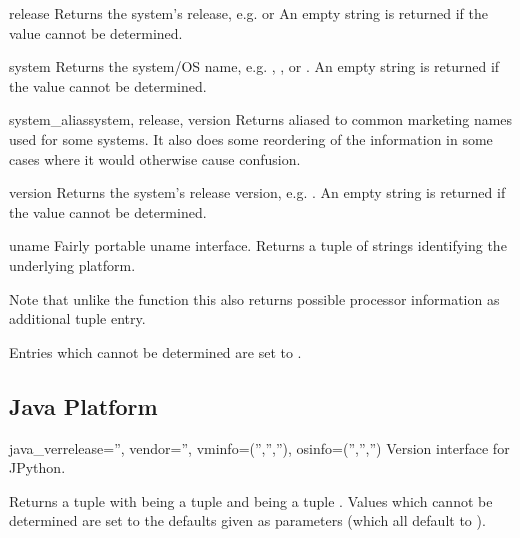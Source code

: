 \begin{funcdesc}{release}{}
  Returns the system's release, e.g.  or 
  An empty string is returned if the value cannot be determined.
\end{funcdesc}

\begin{funcdesc}{system}{}
  Returns the system/OS name, e.g. , ,
  or .
  An empty string is returned if the value cannot be determined.
\end{funcdesc}

\begin{funcdesc}{system_alias}{system, release, version}
  Returns  aliased
  to common marketing names used for some systems.  It also does some
  reordering of the information in some cases where it would otherwise
  cause confusion.
\end{funcdesc}

\begin{funcdesc}{version}{}
  Returns the system's release version, e.g. .
  An empty string is returned if the value cannot be determined.
\end{funcdesc}

\begin{funcdesc}{uname}{}
  Fairly portable uname interface. Returns a tuple of strings
   identifying the underlying
  platform.

  Note that unlike the  function this also returns
  possible processor information as additional tuple entry.

  Entries which cannot be determined are set to .
\end{funcdesc}


\subsection{Java Platform}

\begin{funcdesc}{java_ver}{release='', vendor='', vminfo=('','',''),
                           osinfo=('','','')}
  Version interface for JPython.

  Returns a tuple  with  being a tuple  and  being a tuple
  .
  Values which cannot be determined are set to the defaults
  given as parameters (which all default to ).
\end{funcdesc}


